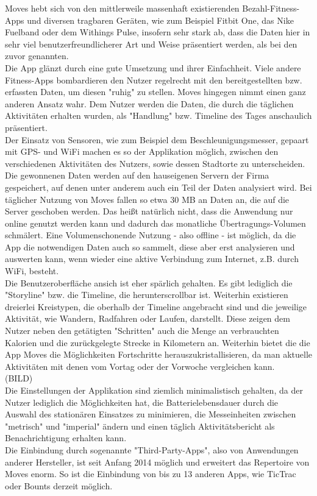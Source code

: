 Moves hebt sich von den mittlerweile massenhaft existierenden Bezahl-Fitness-Apps und diversen tragbaren Geräten, wie zum Beispiel Fitbit One, das Nike Fuelband oder dem Withings Pulse, insofern sehr stark ab, dass die Daten hier in sehr viel benutzerfreundlicherer Art und Weise präsentiert werden, als bei den zuvor genannten.
\\
Die App glänzt durch eine gute Umsetzung und ihrer Einfachheit. 
Viele andere Fitness-Apps bombardieren den Nutzer regelrecht mit den bereitgestellten bzw. erfassten Daten, um diesen "ruhig" zu stellen. 
Moves hingegen nimmt einen ganz anderen Ansatz wahr. 
Dem Nutzer werden die Daten, die durch die täglichen Aktivitäten erhalten wurden, als "Handlung" bzw. Timeline des Tages anschaulich präsentiert.
\\
Der Einsatz von Sensoren, wie zum Beispiel dem Beschleunigungsmesser, gepaart mit GPS- und WiFi machen es so der Applikation möglich, zwischen den verschiedenen Aktivitäten des Nutzers, sowie dessen Stadtorte zu unterscheiden. 
Die gewonnenen Daten werden auf den hauseigenen Servern der Firma gespeichert, auf denen unter anderem auch ein Teil der Daten analysiert wird. 
Bei täglicher Nutzung von Moves fallen so etwa 30 MB an Daten an, die auf die Server geschoben werden. 
Das heißt natürlich nicht, dass die Anwendung nur online genutzt werden kann und dadurch das monatliche Übertragungs-Volumen schmälert. 
Eine Volumenschonende Nutzung - also offline - ist möglich, da die App die notwendigen Daten auch so sammelt, diese aber erst analysieren und auswerten kann, wenn wieder eine aktive Verbindung zum Internet, z.B. durch WiFi, besteht.   
\\
Die Benutzeroberfläche ansich ist eher spärlich gehalten. 
Es gibt lediglich die "Storyline" bzw. die Timeline, die herunterscrollbar ist. 
Weiterhin existieren dreierlei Kreistypen, die oberhalb der Timeline angebracht sind und die jeweilige Aktivität, wie Wandern, Radfahren oder Laufen, darstellt. 
Diese zeigen dem Nutzer neben den getätigten "Schritten" auch die Menge an verbrauchten Kalorien und die zurückgelegte Strecke in Kilometern an. 
Weiterhin bietet die die App Moves die Möglichkeiten Fortschritte herauszukristallisieren, da man aktuelle Aktivitäten mit denen vom Vortag oder der Vorwoche vergleichen kann.   
\\
(BILD)
\\
Die Einstellungen der Applikation sind ziemlich minimalistisch gehalten, da der Nutzer lediglich die Möglichkeiten hat, die Batterielebensdauer durch die Auswahl des stationären Einsatzes zu minimieren, die Messeinheiten zwischen "metrisch" und "imperial" ändern und einen täglich Aktivitätsbericht als Benachrichtigung erhalten kann. 
\\
Die Einbindung durch sogenannte "Third-Party-Apps", also von Anwendungen anderer Hersteller, ist seit Anfang 2014 möglich und erweitert das Repertoire von Moves enorm. 
So ist die Einbindung von bis zu 13 anderen Apps, wie TicTrac oder Bounts derzeit möglich.  
\\

